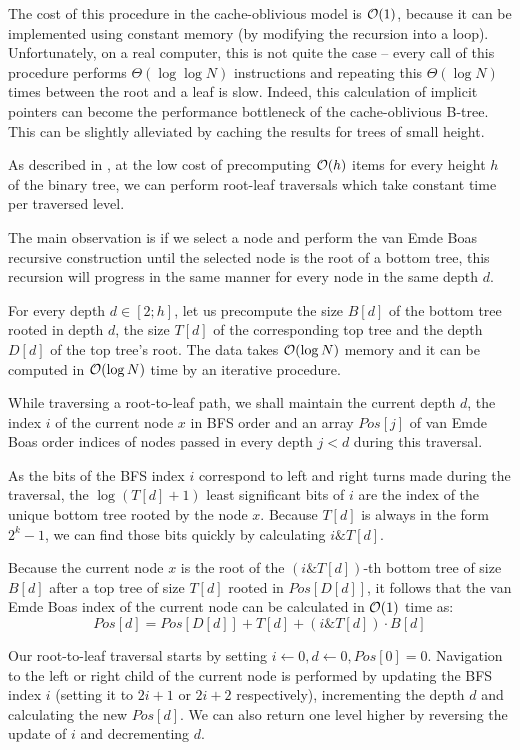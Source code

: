 The cost of this procedure in the cache-oblivious model is $\mathcal{O}(1)$, because
it can be implemented using constant memory (by modifying the recursion into
a loop). Unfortunately, on a real computer, this is not quite the case --
every call of this procedure performs $\Theta(\log\log N)$ instructions and
repeating this $\Theta(\log N)$ times between the root and a leaf is slow.
Indeed, this calculation of implicit pointers can become the performance
bottleneck of the cache-oblivious B-tree.
This can be slightly alleviated by caching the results for trees of small
height.

As described in \cite{brodal01}, at the low cost of precomputing $\mathcal{O}(h)$
items for every height $h$ of the binary tree, we can perform root-leaf
traversals which take constant time per traversed level.

The main observation is if we select a node and perform the van Emde Boas
recursive construction until the selected node is the root of a bottom tree,
this recursion will progress in the same manner for every node in the same
depth $d$.

For every depth $d\in[2;h]$, let us precompute the size $B[d]$ of
the bottom tree rooted in depth $d$, the size $T[d]$ of the corresponding
top tree and the depth $D[d]$ of the top tree's root. The data takes $\mathcal{O}(\log
N)$ memory and it can be computed in $\mathcal{O}(\log N)$ time by an iterative procedure.

While traversing a root-to-leaf path, we shall maintain the current depth
$d$, the index $i$ of the current node $x$ in BFS order and an array
$Pos[j]$ of van Emde Boas order indices of nodes passed in every depth $j<d$
during this traversal.

As the bits of the BFS index $i$ correspond to left and right turns made during
the traversal, the $\log(T[d]+1)$ least significant bits of $i$ are the
index of the unique bottom tree rooted by the node $x$. Because $T[d]$ is
always in the form $2^k-1$, we can find those bits quickly by calculating
$i \& T[d]$.

Because the current node $x$ is the root of the $(i \& T[d])$-th
bottom tree of size $B[d]$ after a top tree of size $T[d]$ rooted in
$Pos[D[d]]$, it follows that the van Emde Boas index of the current node can be
calculated in $\mathcal{O}(1)$ time as:
$$Pos[d]=Pos[D[d]] + T[d] + (i \& T[d]) \cdot B[d]$$

Our root-to-leaf traversal starts by setting $i\gets 0, d\gets 0, Pos[0]=0$.
Navigation to the left or right child of the current node is performed
by updating the BFS index $i$ (setting it to $2i+1$ or $2i+2$ respectively),
incrementing the depth $d$ and calculating the new $Pos[d]$.
We can also return one level higher by reversing the update of $i$ and
decrementing $d$.

